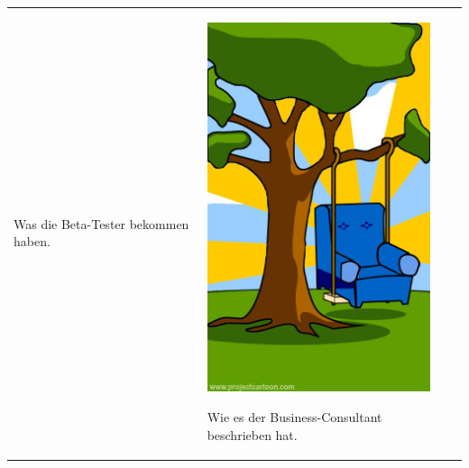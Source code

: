 \begin{tabularx}{\textwidth}{XXXX}
\begin{minipage}[t]{0.23\textwidth}
\begin{center}
Was die Beta-Tester bekommen haben.
\end{center}
\end{minipage}
&
\begin{minipage}[t]{0.23\textwidth}
\begin{center}
\includegraphics[width=1.0\textwidth]{./inf/SEKII/29_Softwaretechnik/PM_06.jpg}

Wie es der Business-Consultant beschrieben hat.


\end{center}
\end{minipage}
\end{tabularx}
